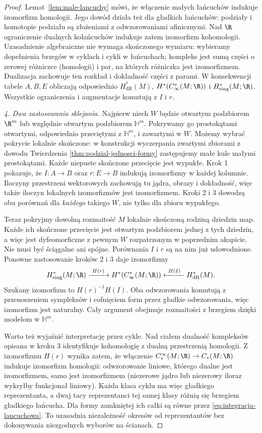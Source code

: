 \begin{proof}
Lemat~\ref{lem:male-lancuchy} mówi, że włączenie małych
łańcuchów indukuje izomorfizm homologii. Jego dowód
działa też dla gładkich łańcuchów: podziały i homotopie
podziału są złożeniami z odwzorowaniami afinicznymi.
Nad $\R$ ograniczenie dualnych kołańcuchów indukuje
zatem izomorfizm kohomologii. Uzasadnienie algebraiczne
nie wymaga skończonego wymiaru: wybieramy dopełnienia
brzegów w cyklach i cykli w łańcuchach; kompleks jest
sumą części o zerowej różniczce (homologii) i par,
na których różniczka jest izomorfizmem. Dualizacja
zachowuje ten rozkład i dokładność części z parami.
W konsekwencji tabele $A,B,E$ obliczają odpowiednio
$H^*_{\mathrm{dR}}(M)$, $H^*(C_\infty^*(M;\R))$
i $H^*_{\mathrm{sing}}(M;\R)$.
Wszystkie ograniczenia i augmentacje komutują z $I$ i $r$.

\emph{4. Dwa zastosowania sklejania.}
Najpierw niech $W$ będzie otwartym podzbiorem $\R^m$
lub względnie otwartym podzbiorem $\mathbb H^m$.
Pokrywamy go prostokątami otwartymi, odpowiednio
przeciętymi z $\mathbb H^m$, i zawartymi w $W$.
Możemy wybrać pokrycie lokalnie skończone: w konstrukcji
wyczerpania zwartymi zbiorami z dowodu Twierdzenia
\ref{thm:podzial-jednosci-formy} zastępujemy małe kule
małymi prostokątami. Każde niepuste skończone przecięcie
jest wypukłe. Krok 1 pokazuje, że $I:A\to B$ oraz
$r:E\to B$ indukują izomorfizmy w każdej kolumnie.
Iloczyny przestrzeni wektorowych zachowują tu jądra,
obrazy i dokładność, więc także iloczyn lokalnych
izomorfizmów jest izomorfizmem. Kroki 2 i 3 dowodzą
obu porównań dla \emph{każdego} takiego $W$, nie tylko
dla zbioru wypukłego.

Teraz pokryjmy dowolną rozmaitość $M$ lokalnie skończoną
rodziną dziedzin map. Każde ich skończone przecięcie
jest otwartym podzbiorem jednej z tych dziedzin,
a więc jest dyfeomorficzne z pewnym $W$ rozpatrzonym
w poprzednim akapicie. Nie musi być ściągalne ani spójne.
Porównania $I$ i $r$ są na nim już udowodnione.
Ponowne zastosowanie kroków 2 i 3 daje izomorfizmy
\[
 H^*_{\mathrm{sing}}(M;\R)
 \xrightarrow{\ H(r)\ }H^*(C_\infty^*(M;\R))
 \xleftarrow{\ H(I)\ }H^*_{\mathrm{dR}}(M).
\]
Szukany izomorfizm to $H(r)^{-1}H(I)$.
Oba odwzorowania komutują z przenoszeniem sympleksów
i cofnięciem form przez gładkie odwzorowania, więc
izomorfizm jest naturalny. Cały argument obejmuje
rozmaitości z brzegiem dzięki modelom w $\mathbb H^m$.

Warto też wyjaśnić interpretację przez cykle. Nad ciałem
dualność kompleksów opisana w kroku 3 identyfikuje
kohomologię z dualną przestrzenią homologii.
Z izomorfizmu $H(r)$ wynika zatem, że włączenie
$C_*^\infty(M;\R)\to C_*(M;\R)$ indukuje izomorfizm
homologii: odwzorowanie liniowe, którego dualne jest
izomorfizmem, samo jest izomorfizmem (niezerowe jądro
lub niezerowy iloraz wykryłby funkcjonał liniowy).
Każda klasa cyklu ma więc gładkiego reprezentanta,
a dwaj tacy reprezentanci tej samej klasy różnią się
brzegiem gładkiego łańcucha. Dla formy zamkniętej ich
całki są równe przez \eqref{eq:integracja-lancuchowa}.
To uzasadnia niezależność okresów od reprezentantów
bez dokonywania niezgodnych wyborów na ścianach.
\end{proof}

